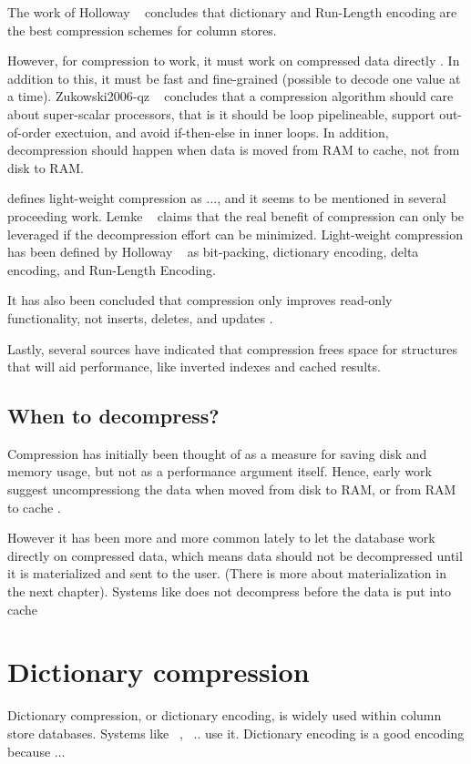 The work of Holloway \ea~\cite{Holloway2008-rr} concludes that dictionary and Run-Length encoding are the best compression schemes for column stores.

However, for compression to work, it must work on compressed data directly \cite{Lemke2010-is}. In addition to this, it must be fast and fine-grained (possible to decode one value at a time). Zukowski2006-qz \ea~\cite{Zukowski2006-oz} concludes that a compression algorithm should care about super-scalar processors, that is it should be loop pipelineable, support out-of-order exectuion, and avoid if-then-else in inner loops. In addition, decompression should happen when data is moved from RAM to cache, not from disk to RAM. 

\cite{Westmann2000-mz} defines light-weight compression as ..., and it seems to be mentioned in several proceeding work. Lemke \ea~\cite{Lemke2010-is} claims that the real benefit of compression can only be leveraged if the decompression effort can be minimized. Light-weight compression has been defined by Holloway \ea~\cite{Holloway2008} as bit-packing, dictionary encoding, delta encoding, and Run-Length Encoding.

It has also been concluded that compression only improves read-only functionality, not inserts, deletes, and updates \cite{Westmann200-mz}.

Lastly, several sources \cite{Lamb2012-kg, Lahiri2015-mz} have indicated that compression frees space for structures that will aid performance, like inverted indexes and cached results.

\subsection{When to decompress?}
\label{sub:When to decompress?}
Compression has initially been thought of as a measure for saving disk and memory usage, but not as a performance argument itself. Hence, early work suggest uncompressiong the data when moved from disk to RAM, or from RAM to cache \cite{Zukowski2006-oz}. 

However it has been more and more common lately to let the database work directly on compressed data, which means data should not be decompressed until it is materialized and sent to the user. (There is more about materialization in the next chapter). Systems like \monetx does not decompress before the data is put into cache \cite{Johnson2008-cp}


\section{Dictionary compression}
\label{sec:Dictionary compression}
Dictionary compression, or dictionary encoding, is widely used within column store databases. Systems like \ibm~\cite{Raman2013-em}, \saph~\cite{Farber2012-vh}.. use it. Dictionary encoding is a good encoding because ... \ea~\cite{Faust2015-ke}

